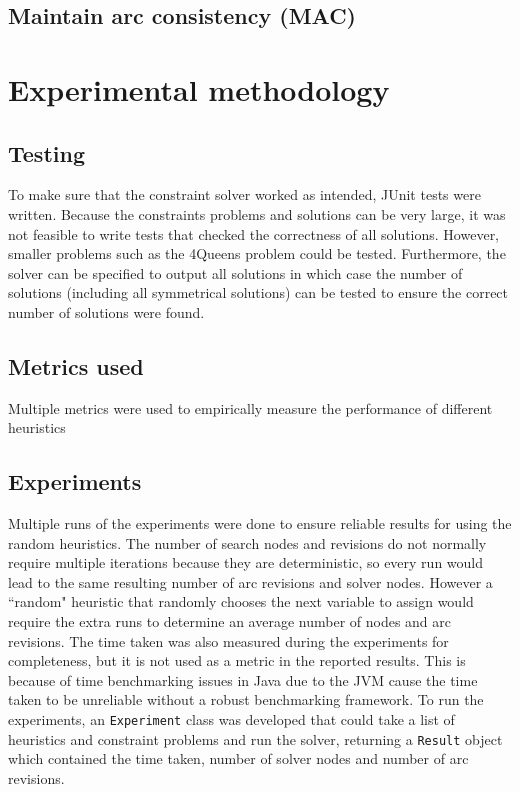 \documentclass{article}
\begin{document}
\subsection{Maintain arc consistency (MAC)}

\section{Experimental methodology}

\subsection{Testing}
To make sure that the constraint solver worked as intended, JUnit tests were written. Because the constraints problems and solutions can be very large, it was not feasible to write tests that checked the correctness of all solutions. However, smaller problems such as the 4Queens problem could be tested. Furthermore, the solver can be specified to output all solutions in which case the number of solutions (including all symmetrical solutions) can be tested to ensure the correct number of solutions were found. 

\subsection{Metrics used}

Multiple metrics were used to empirically measure the performance of different heuristics

\subsection{Experiments}
Multiple runs of the experiments were done to ensure reliable results for using the random heuristics. The number of search nodes and revisions do not normally require multiple iterations because they are deterministic, so every run would lead to the same resulting number of arc revisions and solver nodes. However a ``random" heuristic that randomly chooses the next variable to assign would require the extra runs to determine an average number of nodes and arc revisions.
\n
The time taken was also measured during the experiments for completeness, but it is not used as a metric in the reported results. This is because of time benchmarking issues in Java due to the JVM \cite{jvm-benchmark} cause the time taken to be unreliable without a robust benchmarking framework. 
\n
To run the experiments, an \texttt{Experiment} class was developed that could take a list of heuristics and constraint problems and run the solver, returning a \texttt{Result} object which contained the time taken, number of solver nodes and number of arc revisions. 
\end{document}
